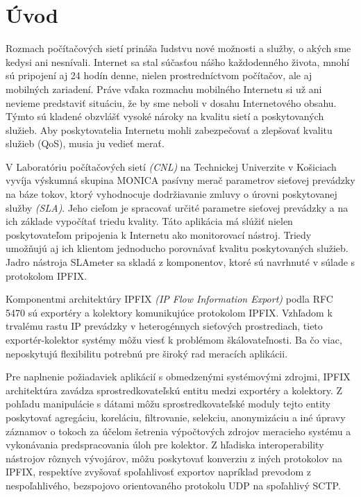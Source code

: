 \setcounter{page}{1}
\setcounter{equation}{0}
\setcounter{figure}{0}
\setcounter{table}{0}

\section*{\'Uvod}

Rozmach počítačových sietí prináša ľudstvu nové možnosti a služby, o akých sme kedysi ani nesnívali.
Internet sa stal súčasťou nášho každodenného života, mnohí sú pripojení aj 24 hodín denne, nielen 
prostredníctvom počítačov, ale aj mobilných zariadení. Práve vďaka rozmachu mobilného Internetu si už
ani nevieme predstaviť situáciu, že by sme neboli v dosahu Internetového obsahu. Týmto sú kladené 
obzvlášť vysoké nároky na kvalitu sietí a poskytovaných služieb. Aby poskytovatelia Internetu mohli 
zabezpečovať a zlepšovať kvalitu služieb (QoS), musia ju vedieť merať.

V Laboratóriu počítačových sietí \emph{(CNL)} na Technickej Univerzite v Košiciach vyvíja výskumná 
skupina MONICA pasívny merač parametrov sieťovej prevádzky na báze tokov, ktorý vyhodnocuje 
dodržiavanie zmluvy o úrovni poskytovanej služby \emph{(SLA)}. Jeho cieľom je spracovať určité parametre 
sieťovej prevádzky a na ich základe vypočítať triedu kvality. Táto aplikácia má slúžiť nielen poskytovateľom 
pripojenia k Internetu ako monitorovací nástroj. Triedy umožňujú aj ich klientom jednoducho 
porovnávať kvalitu poskytovaných služieb. Jadro nástroja SLAmeter sa skladá z komponentov, ktoré sú 
navrhnuté v súlade s protokolom IPFIX.

Komponentmi architektúry IPFIX \emph{(IP Flow Information Export)} podla RFC 5470 \citep{rfc5470}
sú exportéry a kolektory komunikujúce protokolom IPFIX. Vzhľadom k trvalému rastu IP prevádzky
v heterogénnych sieťových prostrediach, tieto exportér-kolektor systémy môžu viesť k problémom 
škálovateľnosti. Ba čo viac, neposkytujú flexibilitu potrebnú pre široký rad meracích aplikácii.

Pre naplnenie požiadaviek aplikácií s obmedzenými systémovými zdrojmi, IPFIX architektúra zavádza 
sprostredkovateľskú entitu medzi exportéry a kolektory. Z pohľadu manipulácie s dátami môžu sprostredkovateľské
moduly tejto entity poskytovať agregáciu, koreláciu, filtrovanie, selekciu, anonymizáciu a iné úpravy záznamov o 
tokoch za účelom 
šetrenia výpočtových zdrojov meracieho systému a vykonávania predspracovania úloh pre kolektor. Z hľadiska
interoperability nástrojov rôznych vývojárov, môžu poskytovať konverziu z iných protokolov na IPFIX, 
respektíve zvyšovať spoľahlivosť exportov napríklad prevodom z nespoľahlivého, bezspojovo orientovaného 
protokolu UDP na spoľahlivý SCTP. \citep{rfc6183}

